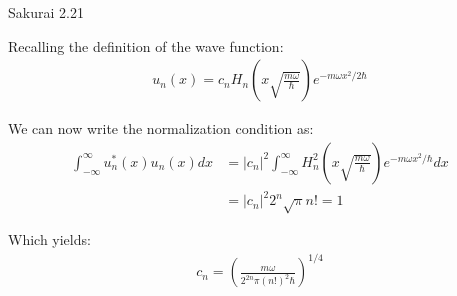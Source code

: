 \documentclass{article}
\begin{document}
\begin{section}{Sakurai 2.21}
\begin{tcolorbox}[breakable]
	Recalling the definition of the wave function:
	\begin{align*}
		u_n(x) = c_n H_n \left(x \sqrt{\frac{m \omega}{\hbar}}\right) e^{-m\omega x^2/2\hbar}
	\end{align*}

	We can now write the normalization condition as:
	\begin{align*}
		\int_{-\infty}^\infty u_n^*(x) u_n(x) dx & = |c_n|^2 \int_{-\infty}^\infty  H_n^2 \left(x \sqrt{\frac{m \omega}{\hbar}}\right)  e^{-m\omega x^2/\hbar} dx \\
		                                         & = |c_n|^2 2^n \sqrt{\pi} n! = 1
	\end{align*}

	Which yields:
	\begin{align*}
		c_n = \left( \frac{m\omega}{2^{2n} \pi (n!)^2 \hbar} \right)^{1/4}
	\end{align*}
\end{tcolorbox}
\end{section}
\end{document}
